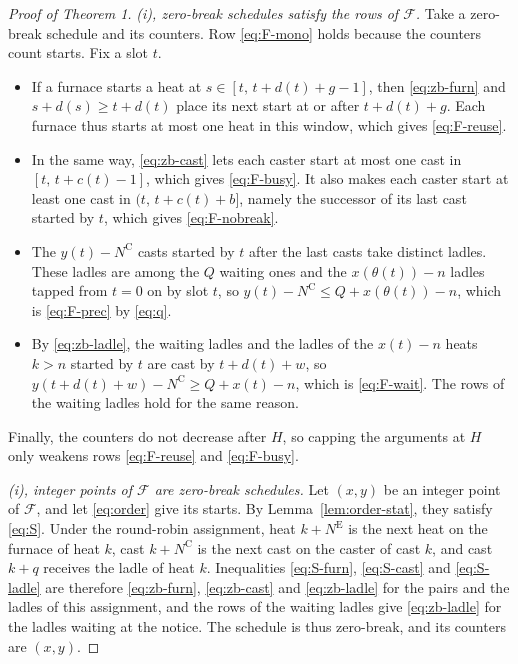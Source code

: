 \documentclass[11pt]{article}
\newcommand{\NE}{N^{\mathrm{E}}}
\newcommand{\NC}{N^{\mathrm{C}}}
\newcommand{\calF}{\mathcal{F}}
\begin{document}
\begin{proof}[Proof of Theorem 1]
\emph{(i), zero-break schedules satisfy the rows of $\calF$.} Take a zero-break schedule and its counters. Row
\eqref{eq:F-mono} holds because the counters count starts. Fix a slot $t$.
\begin{itemize}[leftmargin=1.5em]
\item If a furnace starts a heat at $s\in[t,\,t+d(t)+g-1]$, then \eqref{eq:zb-furn} and $s+d(s)\ge t+d(t)$ place its
next start at or after $t+d(t)+g$. Each furnace thus starts at most one heat in this window, which gives
\eqref{eq:F-reuse}.
\item In the same way, \eqref{eq:zb-cast} lets each caster start at most one cast in $[t,\,t+c(t)-1]$, which gives
\eqref{eq:F-busy}. It also makes each caster start at least one cast in $(t,\,t+c(t)+b]$, namely the successor of its
last cast started by $t$, which gives \eqref{eq:F-nobreak}.
\item The $y(t)-\NC$ casts started by $t$ after the last casts take distinct ladles. These ladles are among the $Q$
waiting ones and the $x(\theta(t))-n$ ladles tapped from $t=0$ on by slot $t$, so $y(t)-\NC\le Q+x(\theta(t))-n$, which
is \eqref{eq:F-prec} by \eqref{eq:q}.
\item By \eqref{eq:zb-ladle}, the waiting ladles and the ladles of the $x(t)-n$ heats $k>n$ started by $t$ are cast by
$t+d(t)+w$, so $y(t+d(t)+w)-\NC\ge Q+x(t)-n$, which is \eqref{eq:F-wait}. The rows of the waiting ladles hold for the
same reason.
\end{itemize}
Finally, the counters do not decrease after $H$, so capping the arguments at $H$ only weakens rows \eqref{eq:F-reuse}
and \eqref{eq:F-busy}.

\emph{(i), integer points of $\calF$ are zero-break schedules.} Let $(x,y)$ be an integer point of $\calF$, and let
\eqref{eq:order} give its starts. By Lemma~\ref{lem:order-stat}, they satisfy \eqref{eq:S}. Under the round-robin
assignment, heat $k+\NE$ is the next heat on the furnace of heat $k$, cast $k+\NC$ is the next cast on the caster of
cast $k$, and cast $k+q$ receives the ladle of heat $k$. Inequalities \eqref{eq:S-furn}, \eqref{eq:S-cast} and
\eqref{eq:S-ladle} are therefore \eqref{eq:zb-furn}, \eqref{eq:zb-cast} and \eqref{eq:zb-ladle} for the pairs and the
ladles of this assignment, and the rows of the waiting ladles give \eqref{eq:zb-ladle} for the ladles waiting at the
notice. The schedule is thus zero-break, and its counters are $(x,y)$.


\end{proof}
\end{document}

